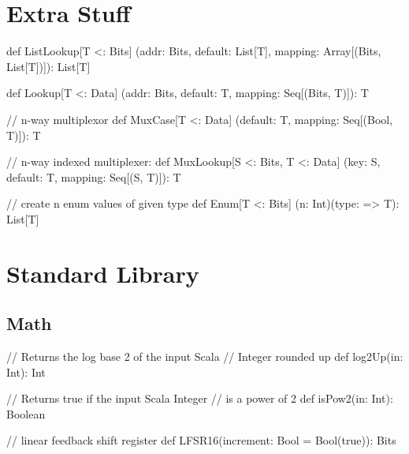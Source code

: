 \documentclass[10pt,twocolumn]{article}
\begin{document}
\section{Extra Stuff}

\lstset{language=scala}

\begin{scala}
def ListLookup[T <: Bits]
  (addr: Bits, default: List[T], 
   mapping: Array[(Bits, List[T])]): List[T]

def Lookup[T <: Data]
  (addr: Bits, default: T, 
   mapping: Seq[(Bits, T)]): T

// n-way multiplexor
def MuxCase[T <: Data] 
  (default: T, mapping: Seq[(Bool, T)]): T

// n-way indexed multiplexer:
def MuxLookup[S <: Bits, T <: Data] 
  (key: S, default: T, mapping: Seq[(S, T)]): T
\end{scala}


\begin{scala}
// create n enum values of given type
def Enum[T <: Bits]
  (n: Int)(type: => T): List[T]
\end{scala}

% 

\section{Standard Library}

\subsection{Math}

\begin{scala}
// Returns the log base 2 of the input Scala 
// Integer rounded up
def log2Up(in: Int): Int

// Returns true if the input Scala Integer 
// is a power of 2
def isPow2(in: Int): Boolean

// linear feedback shift register
def LFSR16(increment: Bool = Bool(true)): Bits
\end{scala}
\end{document}
